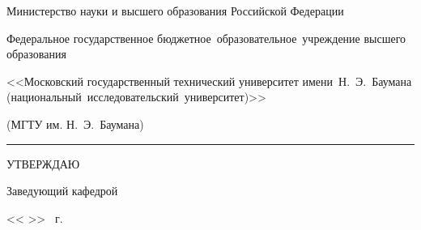 \thispagestyle{empty}

\fontsize{12pt}{12pt}\selectfont
\begin{center}
    {


        \begin{minipage}{0.99\textwidth}\centering\bfseries
            {
                \linespread{1}\selectfont
                {Министерство науки и высшего образования Российской Федерации}

                {Федеральное государственное бюджетное~образовательное~учреждение высшего образования}

                {<<Московский государственный технический университет имени~Н.~Э.~Баумана (национальный~исследовательский~университет)>>}

                {(МГТУ им. Н.~Э.~Баумана)}
            }
        \end{minipage}
    }

    \vspace{0.2cm}

    \rule{\linewidth}{3.4pt}
\end{center}

\fontsize{11pt}{11pt}\selectfont
\begin{flushright}
    \begin{minipage}{0.4\textwidth}\raggedleft

        УТВЕРЖДАЮ \hspace{2.5cm}

        Заведующий кафедрой~

        \vspace{0.3cm}

        \ulinetext{}{} 

        \vspace{0.3cm}

        << \ulinetext[1cm]{}{} >> \ulinetext{}{} \the\year \ г.
    \end{minipage}
\end{flushright}

